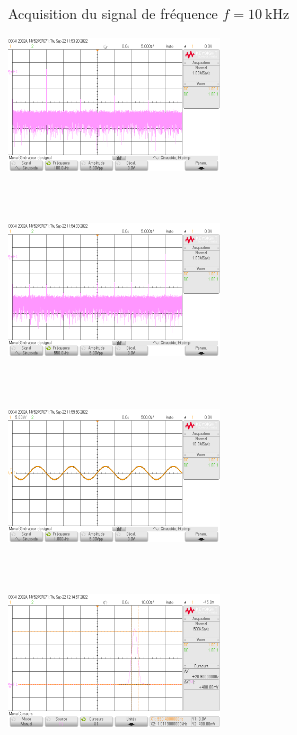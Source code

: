 \documentclass[a4paper]{article}
\begin{document}
\begin{multicols}{2}
\begin{figure}[H]
			\caption{Acquisition du signal de fréquence $f = 10\:\mathrm{kHz}$}
		\end{figure}
		\begin{figure}[H]
			\centering
			\includegraphics[width=0.5\textwidth]{figures/scope_1.png}
			\caption{}
		\end{figure}

		~

		\begin{figure}[H]
			\centering
			\includegraphics[width=0.5\textwidth]{figures/scope_2.png}
			\caption{}
		\end{figure}

		~

		\begin{figure}[H]
			\centering
			\includegraphics[width=0.5\textwidth]{figures/scope_3.png}
			\caption{}
		\end{figure}

		~

		\begin{figure}[H]
			\centering
			\includegraphics[width=0.5\textwidth]{figures/scope_4.png}
			\caption{}
		\end{figure}
	\end{multicols}
\end{document}
